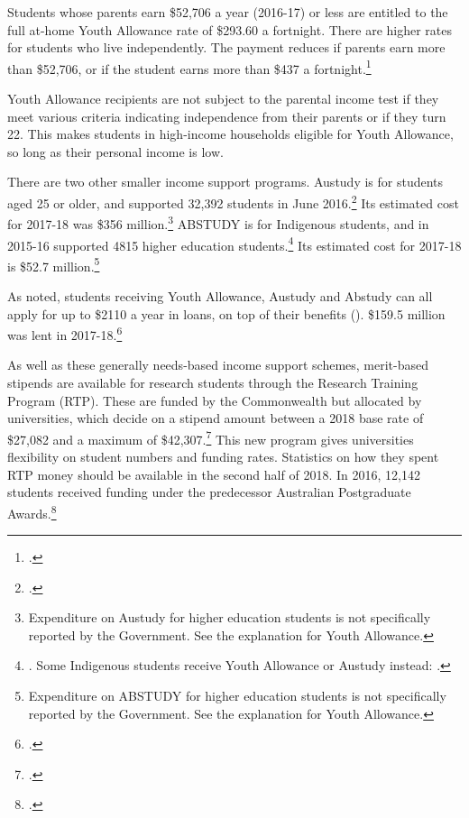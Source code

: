 \documentclass{grattan}
\begin{document}
Students whose parents earn \$52,706 a year (2016-17) or less are entitled to the full at-home Youth Allowance rate of \$293.60 a fortnight. There are higher rates for students who live independently. The payment reduces if parents earn more than \$52,706, or if the student earns more than \$437 a fortnight.\footcite[][]{DepartmentofHumanServices2018youthallowancefor}

Youth Allowance recipients are not subject to the parental income test if they meet various criteria indicating independence from their parents or if they turn 22. This makes students in high-income households eligible for Youth Allowance, so long as their personal income is low.

There are two other smaller income support programs. Austudy is for students aged 25 or older, and supported 32,392 students in June 2016.\footcite[][]{DepartmentofSocialServices2017austudypaymenttre} Its estimated cost for 2017-18 was \$356 million.\footnote{Expenditure on Austudy for higher education students is not specifically reported by the Government. See the explanation for Youth Allowance.} ABSTUDY is for Indigenous students, and in 2015-16 supported 4815 higher education students.\footnote{\textcite[][16]{ANAO2017administrationofy}. Some Indigenous students receive Youth Allowance or Austudy instead: \textcite[][]{DepartmentofSocialServices2018dsspaymentdemogra}.} Its estimated cost for 2017-18 is \$52.7 million.\footnote{Expenditure on ABSTUDY for higher education students is not specifically reported by the Government. See the explanation for Youth Allowance.}

As noted, students receiving Youth Allowance, Austudy and Abstudy can all apply for up to \$2110 a year in loans, on top of their benefits (). \$159.5 million was lent in 2017-18.\footcite[][47]{DepartmentofSocialServices2018porfoliobudgetsta}

As well as these generally needs-based income support schemes, merit-based stipends are available for research students through the Research Training Program (RTP). These are funded by the Commonwealth but allocated by universities, which decide on a stipend amount between a 2018 base rate of \$27,082 and a maximum of \$42,307.\footcite[][]{DepartmentofEducationandTraining2018researchtrainingp} This new program gives universities flexibility on student numbers and funding rates. Statistics on how they spent RTP money should be available in the second half of 2018. In 2016, 12,142 students received funding under the predecessor Australian Postgraduate Awards.\footcite[][]{DepartmentofEducationandTraining2018answertoquestion}
\end{document}
